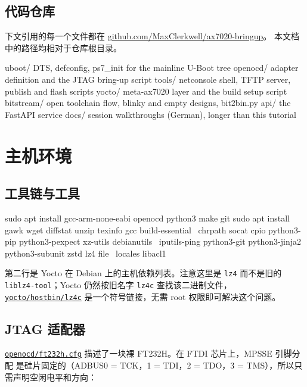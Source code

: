 \documentclass[11pt,a4paper,oneside]{article}
\newcommand{\cmd}[1]{\texttt{#1}}
\newcommand{\repo}{https://github.com/MaxClerkwell/ax7020-bringup}
\newcommand{\rfile}[1]{\href{\repo/blob/master/#1}{\color{bluemid}\nolinkurl{#1}}}
\begin{document}
\subsection{代码仓库}

下文引用的每一个文件都在 \href{\repo}{github.com/MaxClerkwell/ax7020-bringup}。
本文档中的路径均相对于仓库根目录。

\begin{code}
uboot/          DTS, defconfig, ps7_init for the mainline U-Boot tree
openocd/        adapter definition and the JTAG bring-up script
tools/          netconsole shell, TFTP server, publish and flash scripts
yocto/          meta-ax7020 layer and the build setup script
bitstream/      open toolchain flow, blinky and empty designs, bit2bin.py
api/            the FastAPI service
docs/           session walkthroughs (German), longer than this tutorial
\end{code}

\section{主机环境}

\subsection{工具链与工具}

\begin{shell}
sudo apt install gcc-arm-none-eabi openocd python3 make git
sudo apt install gawk wget diffstat unzip texinfo gcc build-essential \
    chrpath socat cpio python3-pip python3-pexpect xz-utils debianutils \
    iputils-ping python3-git python3-jinja2 python3-subunit zstd lz4 file \
    locales libacl1
\end{shell}

第二行是 Yocto 在 Debian 上的主机依赖列表。注意这里是 \cmd{lz4} 而不是旧的
\cmd{liblz4-tool}；Yocto 仍然按旧名字 \cmd{lz4c} 查找该二进制文件，
\rfile{yocto/hostbin/lz4c} 是一个符号链接，无需 root 权限即可解决这个问题。

\subsection{JTAG 适配器}

\rfile{openocd/ft232h.cfg} 描述了一块裸 FT232H。在 FTDI 芯片上，MPSSE 引脚分配
是硅片固定的（ADBUS0 = TCK，1 = TDI，2 = TDO，3 = TMS），所以只需声明空闲电平和方向：
\end{document}
